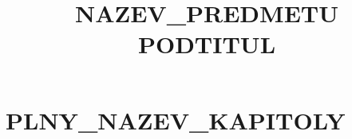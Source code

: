 \documentclass[11pt,a4paper]{book}
\title{{{NAZEV_PREDMETU}}\\[1ex]
  \large {{PODTITUL}}}
\author{}
\date{}
\begin{document}
\maketitle
\tableofcontents

\chapter{{{PLNY_NAZEV_KAPITOLY}}}


% 
\end{document}
